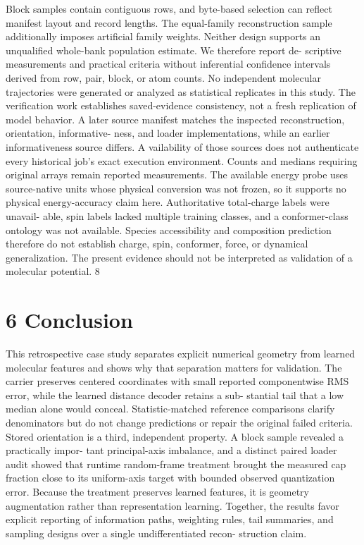 \documentclass[11pt]{article}
\begin{document}
Block samples contain contiguous rows, and byte-based selection can reflect manifest layout and
record lengths. The equal-family reconstruction sample additionally imposes artificial family weights.
Neither design supports an unqualified whole-bank population estimate. We therefore report de-
scriptive measurements and practical criteria without inferential confidence intervals derived from
row, pair, block, or atom counts. No independent molecular trajectories were generated or analyzed
as statistical replicates in this study.
The verification work establishes saved-evidence consistency, not a fresh replication of model
behavior. A later source manifest matches the inspected reconstruction, orientation, informative-
ness, and loader implementations, while an earlier informativeness source differs. A vailability of
those sources does not authenticate every historical job’s exact execution environment. Counts and
medians requiring original arrays remain reported measurements.
The available energy probe uses source-native units whose physical conversion was not frozen, so
it supports no physical energy-accuracy claim here. Authoritative total-charge labels were unavail-
able, spin labels lacked multiple training classes, and a conformer-class ontology was not available.
Species accessibility and composition prediction therefore do not establish charge, spin, conformer,
force, or dynamical generalization. The present evidence should not be interpreted as validation of
a molecular potential.
8


\section*{6 Conclusion}

This retrospective case study separates explicit numerical geometry from learned molecular features
and shows why that separation matters for validation. The carrier preserves centered coordinates
with small reported componentwise RMS error, while the learned distance decoder retains a sub-
stantial tail that a low median alone would conceal. Statistic-matched reference comparisons clarify
denominators but do not change predictions or repair the original failed criteria.
Stored orientation is a third, independent property. A block sample revealed a practically impor-
tant principal-axis imbalance, and a distinct paired loader audit showed that runtime random-frame
treatment brought the measured cap fraction close to its uniform-axis target with bounded observed
quantization error. Because the treatment preserves learned features, it is geometry augmentation
rather than representation learning. Together, the results favor explicit reporting of information
paths, weighting rules, tail summaries, and sampling designs over a single undifferentiated recon-
struction claim.
\end{document}
